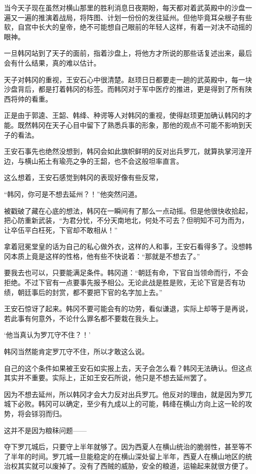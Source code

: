 当今天子现在虽然对横山那里的胜利消息日夜期盼，每天都对着武英殿中的沙盘一遍又一遍的推演着战局，将阵图、计划一份份的发往延州。但他毕竟耳朵根子有些软，自宫中长大的皇帝，绝不可能想自己眼前的年轻人这样，有着一对决不动摇的眼神。

一旦韩冈站到了天子的面前，指着沙盘上，将他方才所说的那些话复述出来，最后会有什么结果，真的难以估计。

天子对韩冈的重视，王安石心中很清楚。赵顼日日都要走一趟的武英殿中，每一块沙盘背后，都是打着韩冈的标签。而韩冈对于军中医疗的推进，更是得到了所有陕西将帅的看重。

正是由于郭逵、王韶、韩绛、种谔等人对韩冈的重视，使得赵顼更加确认韩冈的才能。既然韩冈在天子心目中留下了熟悉兵事的形象，那他的观点不可能不影响到天子的看法。

王安石事先也绝然没想到，韩冈会如此旗帜鲜明的反对出兵罗兀，就算执掌河湟开边，与横山拓土有瑜亮之争的王韶，也不会这般坦率直言。

这么想着，王安石感觉到韩冈的表现好像有些反常，

“韩冈，你可是不想去延州？！”他突然问道。

被戳破了藏在心底的想法，韩冈在一瞬间有了那么一点动摇。但是他很快收拾起，把心防重新武装，“为君分忧，不分天南地北，何处不可去？但明知不可为而为，让卒伍平白枉死，下官却不敢相从！”

拿着冠冕堂皇的话为自己的私心做外衣，这样的人和事，王安石看得多了。没想韩冈本质上竟是这样的性格，他有些不快说着：“那就是不想去了。”

要我去也可以，只要能满足条件。韩冈道：“朝廷有命，下官自当领命而行，不会拒绝。不过下官有一点要事先报予相公。无论此战是胜是败，无论下官是否有功绩，朝廷事后的封赏，都不要把下官的名字加上去。”

王安石惊讶了起来。韩冈不要可能会有的功劳，看似谦退，实际上却等于是再说，若此事有何意外，不论什么罪名都不要栽在我头上。

‘他当真认为罗兀守不住？！’

韩冈当然能肯定罗兀守不住，所以才敢这么说。

自己的这个条件如果被王安石如实报上去，天子会怎么看？韩冈无法确认。但这点其实并不重要。实际上，正如王安石所说，他只是不想去延州罢了。

因为不想去延州，所以韩冈才会大力反对出兵罗兀。他反对的理由，就是因为罗兀城下必败。韩冈可以确定，至少有九成以上的可能，韩绛在横山方向上这一轮的攻势，将会铩羽而归。

这并不是因为粮秣问题——

夺下罗兀城后，只要守上半年就够了。因为西夏人在横山统治的脆弱性，甚至等不了半年的时间。罗兀城一旦能稳定的在横山深处留上半年，西夏人在横山地区的统治权其实就可以废掉了。没有了西贼的威胁，安全的粮道，运输起来就很方便了。

